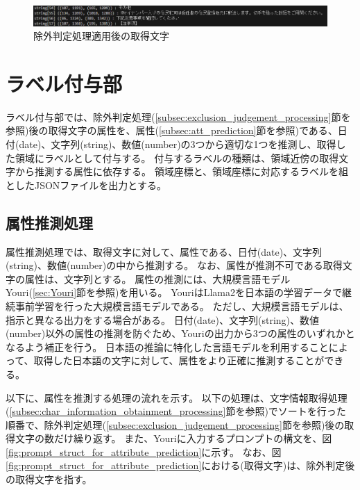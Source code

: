 \begin{figure}[t]
    \begin{center}
        \includegraphics[width=15cm]{image/04-implementation/after_exclusion_string.png}
        \caption{除外判定処理適用後の取得文字}
        \label{fig:after_exclusion_string}
    \end{center}
\end{figure}

\section{ラベル付与部}\label{sec:label_link_part}
ラベル付与部では、除外判定処理(\ref{subsec:exclusion_judgement_processing}節を参照)後の取得文字の属性を、属性(\ref{subsec:att_prediction}節を参照)である、日付(date)、文字列(string)、数値(number)の3つから適切な1つを推測し、取得した領域にラベルとして付与する。
付与するラベルの種類は、領域近傍の取得文字から推測する属性に依存する。
領域座標と、領域座標に対応するラベルを組としたJSONファイルを出力とする。

\subsection{属性推測処理}\label{subsec:att_prediction_processing}
属性推測処理では、取得文字に対して、属性である、日付(date)、文字列(string)、数値(number)の中から推測する。
なお、属性が推測不可である取得文字の属性は、文字列とする。
属性の推測には、大規模言語モデルYouri(\ref{sec:Youri}節を参照)を用いる。
YouriはLlama2を日本語の学習データで継続事前学習を行った大規模言語モデルである。
ただし、大規模言語モデルは、指示と異なる出力をする場合がある。
日付(date)、文字列(string)、数値(number)以外の属性の推測を防ぐため、Youriの出力から3つの属性のいずれかとなるよう補正を行う。
日本語の推論に特化した言語モデルを利用することによって、取得した日本語の文字に対して、属性をより正確に推測することができる。

以下に、属性を推測する処理の流れを示す。
以下の処理は、文字情報取得処理(\ref{subsec:char_information_obtainment_processing}節を参照)でソートを行った順番で、除外判定処理(\ref{subsec:exclusion_judgement_processing}節を参照)後の取得文字の数だけ繰り返す。
また、Youriに入力するプロンプトの構文を、図\ref{fig:prompt_struct_for_attribute_prediction}に示す。
なお、図\ref{fig:prompt_struct_for_attribute_prediction}における(取得文字)は、除外判定後の取得文字を指す。

